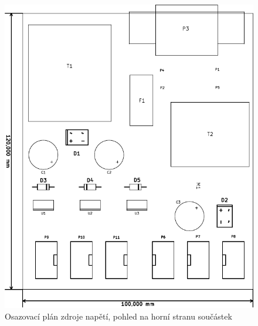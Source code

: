 \begin{figure}[H]
	\centering
	\includegraphics[width=170mm]{img/zdroj/os_f.pdf}
	\caption{Osazovací plán zdroje napětí, pohled na horní stranu součástek}    		
\end{figure}

